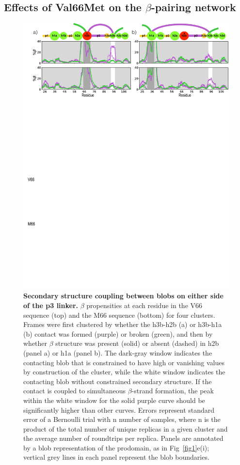 \documentclass[10pt,letterpaper]{article}
\begin{document}
\subsection*{Effects of Val66Met on the $\beta$-pairing network} 
\label{sec:betacoupling}
\begin{figure}[!ht]
\includegraphics[scale=0.5,width=\textwidth,trim={0 0cm 0 0cm},clip]{./figures/fig6.pdf}
\caption{{\bf Secondary structure coupling between blobs on either side of the p3 linker.} $\beta$ propensities at each residue in the V66 sequence (top) and the M66 sequence (bottom) for four clusters. Frames were first clustered by whether the h3b-h2b (a) or h3b-h1a (b) contact was formed (purple) or broken (green), and then by whether $\beta$ structure was present (solid) or absent (dashed) in h2b (panel a) or h1a (panel b). The dark-gray window indicates the contacting blob that is constrained to have high or vanishing values by construction of the cluster, while the white window indicates the contacting blob without constrained secondary structure. If the contact is coupled to simultaneous $\beta$-strand formation, the peak within the white window for the solid purple curve should be significantly higher than other curves. Errors represent standard error of a Bernoulli trial with n number of samples, where n is the product of the total number of unique replicas in a given cluster and the average number of roundtrips per replica. Panels are annotated by a blob representation of the prodomain, as in Fig~\ref{fig1}e(i); vertical grey lines in each panel represent the blob boundaries. }
\label{fig6}
\end{figure}
\end{document}
